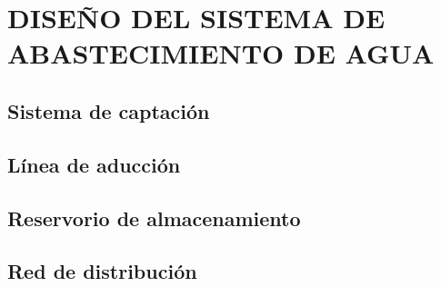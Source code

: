 \chapter{DISEÑO DEL SISTEMA DE ABASTECIMIENTO DE AGUA}
    \section{Sistema de captación}
    \section{Línea de aducción}
    \section{Reservorio de almacenamiento}
    \section{Red de distribución}